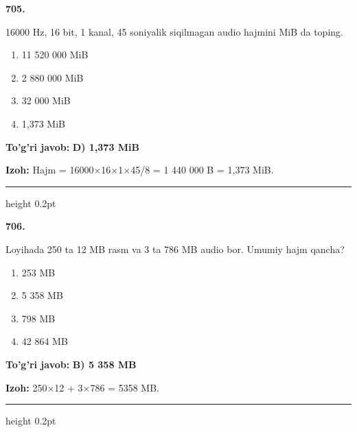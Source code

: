 \documentclass[10pt,a4paper,oneside]{article}
\begin{document}
\noindent\textbf{\color{ink}705.}
\par
16000 Hz, 16 bit, 1 kanal, 45 soniyalik siqilmagan audio hajmini MiB da toping.
\begin{enumerate}[label=\Alph*),leftmargin=9mm]
\item 11 520 000 MiB
\item 2 880 000 MiB
\item 32 000 MiB
\item 1,373 MiB
\end{enumerate}
\begin{tcolorbox}[enhanced,breakable,colback=teal!4,colframe=teal!50!black,boxrule=0.5pt,arc=1.1mm,left=3mm,right=3mm,top=1.7mm,bottom=1.7mm,before skip=2mm,after skip=2mm]
\textbf{\color{teal}To'g'ri javob:} \textbf{D) 1,373 MiB}
\par\smallskip
\textbf{Izoh:} Hajm = 16000\ensuremath{\times}16\ensuremath{\times}1\ensuremath{\times}45/8 = 1 440 000 B = 1,373 MiB.
\end{tcolorbox}
\vspace{2mm}\hrule height 0.2pt \vspace{3mm}

\noindent\textbf{\color{ink}706.}
\par
Loyihada 250 ta 12 MB rasm va 3 ta 786 MB audio bor. Umumiy hajm qancha?
\begin{enumerate}[label=\Alph*),leftmargin=9mm]
\item 253 MB
\item 5 358 MB
\item 798 MB
\item 42 864 MB
\end{enumerate}
\begin{tcolorbox}[enhanced,breakable,colback=teal!4,colframe=teal!50!black,boxrule=0.5pt,arc=1.1mm,left=3mm,right=3mm,top=1.7mm,bottom=1.7mm,before skip=2mm,after skip=2mm]
\textbf{\color{teal}To'g'ri javob:} \textbf{B) 5 358 MB}
\par\smallskip
\textbf{Izoh:} 250\ensuremath{\times}12 + 3\ensuremath{\times}786 = 5358 MB.
\end{tcolorbox}
\vspace{2mm}\hrule height 0.2pt \vspace{3mm}
\end{document}
